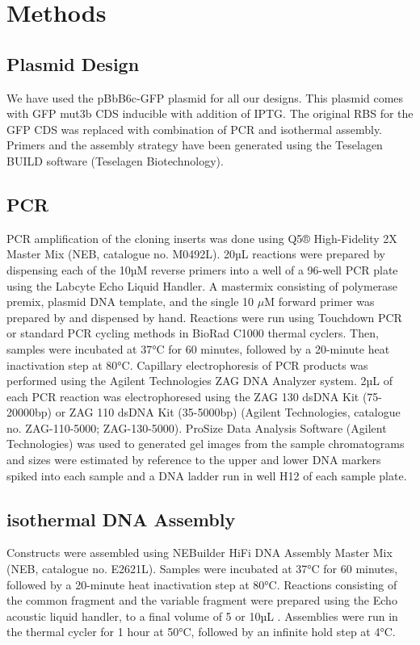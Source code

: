 \section{Methods}

\subsection{Plasmid Design}

We have used the pBbB6c-GFP plasmid for all our designs. This plasmid comes with GFP mut3b CDS inducible with addition of IPTG. The original RBS for the GFP CDS was replaced with combination of PCR and isothermal assembly. Primers and the assembly strategy have been generated using the Teselagen BUILD software (Teselagen Biotechnology).

\subsection{PCR}
PCR amplification of the cloning inserts was done using Q5® High-Fidelity 2X Master Mix (NEB, catalogue no. M0492L). 20µL reactions were prepared by dispensing each of the 10µM reverse primers into a well of a 96-well PCR plate using the Labcyte Echo Liquid Handler. A mastermix consisting of polymerase premix, plasmid DNA template, and the single 10 \(\mu\)M forward primer was prepared by and dispensed by hand. Reactions were run using Touchdown PCR or standard PCR cycling methods in BioRad C1000 thermal cyclers. Then, samples were incubated at 37°C for 60 minutes, followed by a 20-minute heat inactivation step at 80°C.
Capillary electrophoresis of PCR products was performed using the Agilent Technologies ZAG DNA Analyzer system. 2µL of each PCR reaction was electrophoresed using the ZAG 130 dsDNA Kit (75-20000bp) or ZAG 110 dsDNA Kit (35-5000bp) (Agilent Technologies, catalogue no. ZAG-110-5000; ZAG-130-5000). ProSize Data Analysis Software (Agilent Technologies) was used to generated gel images from the sample chromatograms and sizes were estimated by reference to the upper and lower DNA markers spiked into each sample and a DNA ladder run in well H12 of each sample plate. 

\subsection{isothermal DNA Assembly}
Constructs were assembled using NEBuilder HiFi DNA Assembly Master Mix (NEB, catalogue no. E2621L). Samples were incubated at 37°C for 60 minutes, followed by a 20-minute heat inactivation step at 80°C. Reactions consisting of the common fragment and the variable fragment were prepared using the Echo acoustic liquid handler, to a final volume of 5 or 10µL . Assemblies were run in the thermal cycler for 1 hour at 50°C, followed by an infinite hold step at 4°C.

